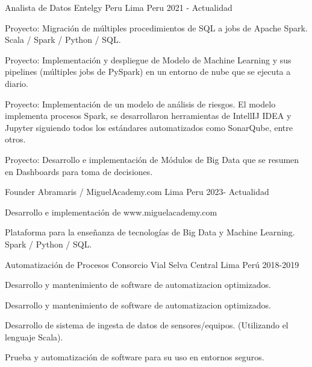 

\begin{cventries}

  \cventry
    {Analista de Datos} %
    {Entelgy Peru} %
    {Lima Peru} %
    {2021 - Actualidad} %
    {
      \begin{cvitems} %
        \item {Proyecto: Migraci\'on de m\'ultiples procedimientos de SQL a jobs de Apache Spark. Scala / Spark / Python / SQL.}
        \item {Proyecto: Implementaci\'on y despliegue de Modelo de Machine Learning y sus pipelines (m\'ultiples jobs de PySpark) en un entorno de nube que se ejecuta a diario.}
        \item {Proyecto: Implementaci\'on de un modelo de an\'alisis de riesgos. El modelo implementa procesos Spark, se desarrollaron herramientas de IntellIJ IDEA y Jupyter siguiendo todos los est\'andares automatizados como SonarQube, entre otros.}
        \item {Proyecto: Desarrollo e implementaci\'on de M\'odulos de Big Data que se resumen en Dashboards para toma de decisiones.}
      \end{cvitems}
    }

  \cventry
  {Founder} %
  {Abramaris / MiguelAcademy.com} %
  {Lima Peru} %
  {2023- Actualidad} %
  {
    \begin{cvitems} %
      \item {Desarrollo e implementaci\'on de www.miguelacademy.com}
      \item {Plataforma para la enseñanza de tecnolog\'ias de Big Data y Machine Learning. Spark / Python / SQL.}
    \end{cvitems}
  }
  \cventry
  {Automatizaci\'on de Procesos} %
  {Consorcio Vial Selva Central} %
  {Lima Per\'u} %
  {2018-2019} %
  {
    \begin{cvitems} %
      \item {Desarrollo y mantenimiento de software de automatizacion optimizados.}
      \item {Desarrollo y mantenimiento de software de automatizacion optimizados.}
      \item {Desarrollo de sistema de ingesta de datos de sensores/equipos. (Utilizando el lenguaje Scala).}
      \item {Prueba y automatizaci\'on de software para su uso en entornos seguros.}


\end{cvitems}}
\end{cventries}
